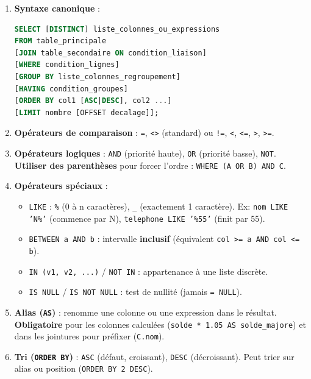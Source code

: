\documentclass[11pt]{article}
\begin{document}
\begin{methode}
\begin{enumerate}
\item \textbf{Syntaxe canonique} :
\begin{lstlisting}[language=SQL]
SELECT [DISTINCT] liste_colonnes_ou_expressions
FROM table_principale
[JOIN table_secondaire ON condition_liaison]
[WHERE condition_lignes]
[GROUP BY liste_colonnes_regroupement]
[HAVING condition_groupes]
[ORDER BY col1 [ASC|DESC], col2 ...]
[LIMIT nombre [OFFSET decalage]];
\end{lstlisting}
\item \textbf{Opérateurs de comparaison} : \texttt{=}, \texttt{<>} (standard) ou \texttt{!=}, \texttt{<}, \texttt{<=}, \texttt{>}, \texttt{>=}.
\item \textbf{Opérateurs logiques} : \texttt{AND} (priorité haute), \texttt{OR} (priorité basse), \texttt{NOT}. \textbf{Utiliser des parenthèses} pour forcer l'ordre : \texttt{WHERE (A OR B) AND C}.
\item \textbf{Opérateurs spéciaux} :
\begin{itemize}
\item \texttt{LIKE} : \texttt{\%} (0 à n caractères), \texttt{\_} (exactement 1 caractère). Ex: \texttt{nom LIKE 'N\%'} (commence par N), \texttt{telephone LIKE '\%55'} (finit par 55).
\item \texttt{BETWEEN a AND b} : intervalle \textbf{inclusif} (équivalent \texttt{col >= a AND col <= b}).
\item \texttt{IN (v1, v2, ...)} / \texttt{NOT IN} : appartenance à une liste discrète.
\item \texttt{IS NULL} / \texttt{IS NOT NULL} : test de nullité (jamais \texttt{= NULL}).
\end{itemize}
\item \textbf{Alias (\texttt{AS})} : renomme une colonne ou une expression dans le résultat. \textbf{Obligatoire} pour les colonnes calculées (\texttt{solde * 1.05 AS solde\_majore}) et dans les jointures pour préfixer (\texttt{C.nom}).
\item \textbf{Tri (\texttt{ORDER BY})} : \texttt{ASC} (défaut, croissant), \texttt{DESC} (décroissant). Peut trier sur alias ou position (\texttt{ORDER BY 2 DESC}).
\end{enumerate}
\end{methode}
\end{document}
